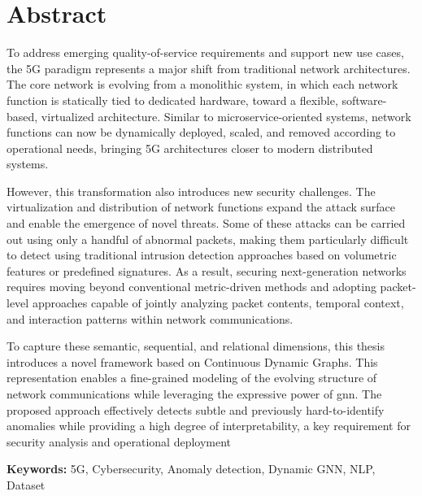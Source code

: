 \documentclass[french,a4paper,11pt,twoside]{StyleThese}
\begin{document}
\section*{Abstract}
To address emerging quality-of-service requirements and support new use cases, the 5G paradigm represents a major shift from traditional network architectures. The core network is evolving from a monolithic system, in which each network function is statically tied to dedicated hardware, toward a flexible, software-based, virtualized architecture. Similar to microservice-oriented systems, network functions can now be dynamically deployed, scaled, and removed according to operational needs, bringing 5G architectures closer to modern distributed systems. 

However, this transformation also introduces new security challenges. The virtualization and distribution of network functions expand the attack surface and enable the emergence of novel threats. Some of these attacks can be carried out using only a handful of abnormal packets, making them particularly difficult to detect using traditional intrusion detection approaches based on volumetric features or predefined signatures. As a result, securing next-generation networks requires moving beyond conventional metric-driven methods and adopting packet-level approaches capable of jointly analyzing packet contents, temporal context, and interaction patterns within network communications. 

To capture these semantic, sequential, and relational dimensions, this thesis introduces a novel framework based on Continuous Dynamic Graphs. This representation enables a fine-grained modeling of the evolving structure of network communications while leveraging the expressive power of \gls{gnn}. The proposed approach effectively detects subtle and previously hard-to-identify anomalies while providing a high degree of interpretability, a key requirement for security analysis and operational deployment

\textbf{Keywords:} 5G, Cybersecurity, Anomaly detection, Dynamic GNN, NLP, Dataset


\cleardoublepage



\tableofcontents

\printnomenclature
%
\end{document}
